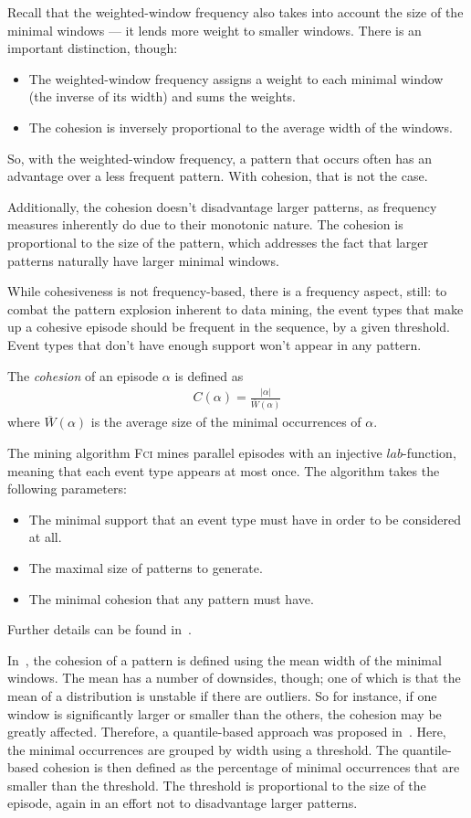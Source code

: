 Recall that the weighted-window frequency also takes into account the size of the minimal windows --- it lends more weight to smaller windows. There is an important distinction, though:
\begin{itemize}
\item The weighted-window frequency assigns a weight to each minimal window (the inverse of its width) and sums the weights.
\item The cohesion is inversely proportional to the average width of the windows.
\end{itemize}

So, with the weighted-window frequency, a pattern that occurs often has an advantage over a less frequent pattern. With cohesion, that is not the case.

Additionally, the cohesion doesn't disadvantage larger patterns, as frequency measures inherently do due to their monotonic nature. The cohesion is proportional to the size of the pattern, which addresses the fact that larger patterns naturally have larger minimal windows.

While cohesiveness is not frequency-based, there is a frequency aspect, still: to combat the pattern explosion inherent to data mining, the event types that make up a cohesive episode should be frequent in the sequence, by a given threshold. Event types that don't have enough support won't appear in any pattern.

The \emph{cohesion} of an episode $ \alpha $ is defined as
\begin{align*}
C(\alpha) = \frac{| \alpha |}{\overline{W}(\alpha)}
\end{align*}
where $ \overline{W}(\alpha) $ is the average size of the minimal occurrences of $ \alpha $.

The mining algorithm \textsc{Fci} mines parallel episodes with an injective $ lab $-function, meaning that each event type appears at most once. The algorithm takes the following parameters:
\begin{itemize}
\item The minimal support that an event type must have in order to be considered at all.
\item The maximal size of patterns to generate.
\item The minimal cohesion that any pattern must have.
\end{itemize}
Further details can be found in~\cite{cule2016efficient}.

In~\cite{cule2016efficient}, the cohesion of a pattern is defined using the mean width of the minimal windows. The mean has a number of downsides, though; one of which is that the mean of a distribution is unstable if there are outliers. So for instance, if one window is significantly larger or smaller than the others, the cohesion may be greatly affected. Therefore, a quantile-based approach was proposed in~\citep{feremans2018mining}. Here, the minimal occurrences are grouped by width using a threshold. The quantile-based cohesion is then defined as the percentage of minimal occurrences that are smaller than the threshold. The threshold is proportional to the size of the episode, again in an effort not to disadvantage larger patterns.

